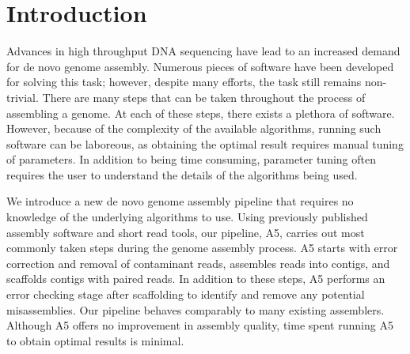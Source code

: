 \documentclass{bioinfo}
\begin{document}
\section{Introduction}
Advances in high throughput DNA sequencing have lead to an increased demand for de novo 
genome assembly. Numerous pieces of software have been developed for solving this task; 
however, despite many efforts, the task still remains non-trivial. There are many 
steps that can be taken throughout the process of assembling a genome. At each of these steps,
there exists a plethora of software. However, because of the complexity of the available algorithms,
running such software can be laboreous, as obtaining the optimal result requires manual tuning of parameters.
In addition to being time consuming, parameter tuning often requires the user to understand the details
of the algorithms being used. 

We introduce a new de novo genome assembly pipeline that requires no knowledge of the underlying algorithms to use. 
Using previously published assembly software and short read tools, our pipeline, A5, carries out
most commonly taken steps during the genome assembly process. A5 starts with error correction
and removal of contaminant reads, assembles reads into contigs, and scaffolds
contigs with paired reads. In addition to these steps, A5 performs an 
error checking stage after scaffolding to identify and remove any potential misassemblies. 
Our pipeline behaves comparably to many existing assemblers. Although A5 offers no improvement
in assembly quality, time spent running A5 to obtain optimal results is minimal. 
\end{document}
